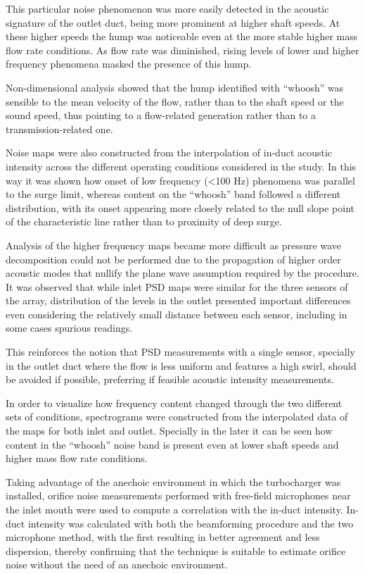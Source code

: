 This particular noise phenomenon was more easily detected in the acoustic signature of the outlet duct, being more prominent at higher shaft speeds. At these higher speeds the hump was noticeable even at the more stable higher mass flow rate conditions. As flow rate was diminished, rising levels of lower and higher frequency phenomena masked the presence of this hump. 

Non-dimensional analysis showed that the hump identified with ``whoosh'' was sensible to the mean velocity of the flow, rather than to the shaft speed or the sound speed, thus pointing to a flow-related generation rather than to a transmission-related one.

Noise maps were also constructed from the interpolation of in-duct acoustic intensity across the different operating conditions considered in the study. In this way it was shown how onset of low frequency (<100 Hz) phenomena was parallel to the surge limit, whereas content on the ``whoosh'' band followed a different distribution, with its onset appearing more closely related to the null slope point of the characteristic line rather than to proximity of deep surge.

Analysis of the higher frequency maps became more difficult as pressure wave decomposition could not be performed due to the propagation of higher order acoustic modes that nullify the plane wave assumption required by the procedure. It was observed that while inlet PSD maps were similar for the three sensors of the array, distribution of the levels in the outlet presented important differences even considering the relatively small distance between each sensor, including in some cases spurious readings. 

This reinforces the notion that PSD measurements with a single sensor, specially in the outlet duct where the flow is less uniform and features a high swirl, should be avoided if possible, preferring if feasible acoustic intensity measurements.

In order to visualize how frequency content changed through the two different sets of conditions, spectrograms were constructed from the interpolated data of the maps for both inlet and outlet. Specially in the later it can be seen how content in the ``whoosh'' noise band is present even at lower shaft speeds and higher mass flow rate conditions. 

Taking advantage of the anechoic environment in which the turbocharger was installed, orifice noise measurements performed with free-field microphones near the inlet mouth were used to compute a correlation with the in-duct intensity. In-duct intensity was calculated with both the beamforming procedure and the two microphone method, with the first resulting in better agreement and less dispersion, thereby confirming that the technique is suitable to estimate orifice noise without the need of an anechoic environment.

